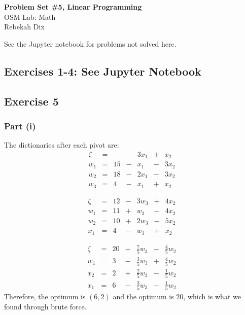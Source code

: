 \documentclass[letterpaper,12pt]{article}
\theoremstyle{definition}
\begin{document}
\begin{flushleft}
  \textbf{\large{Problem Set \#5, Linear Programming}} \\
  OSM Lab: Math \\
  Rebekah Dix
\end{flushleft}

\vspace{5mm}
See the Jupyter notebook for problems not solved here.
\subsection*{Exercises 1-4: See Jupyter Notebook}
\subsection*{Exercise 5}
\subsubsection*{Part (i)}
The dictionaries after each pivot are:
\begin{equation*}
\begin{matrix}
\zeta &= & & & 3x_1 &+& x_2 \\
\hline
w_1 &= &15 &-& x_1 &-& 3x_2\\
w_2 &= &18 &-& 2x_1 &-& 3x_2 \\
w_3 &= &4 &- & x_1 &+& x_2
\end{matrix}
\end{equation*}

\begin{equation*}
\begin{matrix}
\zeta &= &12&-& 3w_3 &+& 4x_2 \\
\hline
w_1 &= &11 &+& w_3 &-& 4x_2\\
w_2 &= &10 &+& 2w_3 &-& 5x_2 \\
x_1 &= &4 &- & w_3 &+& x_2
\end{matrix}
\end{equation*}

\begin{equation*}
\begin{matrix}
\zeta &= &20&-& \frac{7}{5} w_3 &-& \frac{4}{5} w_2 \\
\hline
w_1 &= &3 &-& \frac{3}{5} w_3 &+& \frac{4}{5}w_2 \\
x_2 &= &2&+& \frac{2}{5} w_3 &-& \frac{1}{5} w_2 \\
x_1 &= &6&- & \frac{3}{5} w_3 &-& \frac{1}{5} w_2
\end{matrix}
\end{equation*}
Therefore, the optimum is $(6,2)$ and the optimum is $20$, which is what we found through brute force. 
\end{document}
